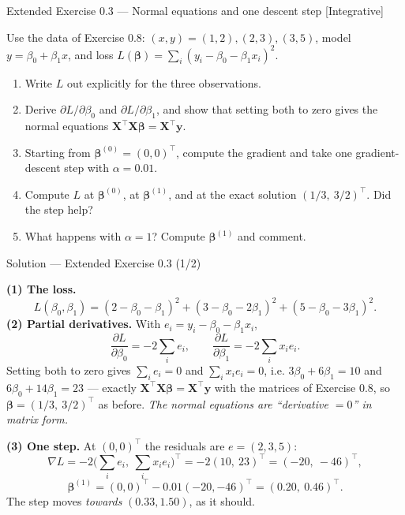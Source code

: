 \documentclass[aspectratio=169,11pt]{beamer}
\begin{document}
\begin{frame}{Extended Exercise 0.3 --- Normal equations and one descent step [Integrative]}
  \begin{longexercise}
    Use the data of Exercise 0.8:
    $(x,y) = (1,2), (2,3), (3,5)$, model $y = \beta_0 + \beta_1 x$, and
    loss $L(\boldsymbol\beta) = \sum_i (y_i - \beta_0 - \beta_1 x_i)^2$.
    \begin{enumerate}
      \item Write $L$ out explicitly for the three observations.
      \item Derive $\partial L/\partial\beta_0$ and
            $\partial L/\partial\beta_1$, and show that setting both to zero
            gives the normal equations
            $\mathbf{X}^\top\mathbf{X}\boldsymbol\beta = \mathbf{X}^\top\mathbf{y}$.
      \item Starting from $\boldsymbol\beta^{(0)} = (0,0)^\top$, compute the
            gradient and take one gradient-descent step with $\alpha = 0.01$.
      \item Compute $L$ at $\boldsymbol\beta^{(0)}$, at
            $\boldsymbol\beta^{(1)}$, and at the exact solution
            $(1/3,\ 3/2)^\top$. Did the step help?
      \item What happens with $\alpha = 1$? Compute
            $\boldsymbol\beta^{(1)}$ and comment.
    \end{enumerate}
  \end{longexercise}
\end{frame}

\begin{frame}{Solution --- Extended Exercise 0.3 (1/2)}
  \begin{solutionbox}
    \scriptsize
    \textbf{(1) The loss.}
    \[
      L(\beta_0,\beta_1) = (2-\beta_0-\beta_1)^2 + (3-\beta_0-2\beta_1)^2
                         + (5-\beta_0-3\beta_1)^2 .
    \]
    \textbf{(2) Partial derivatives.} With $e_i = y_i-\beta_0-\beta_1x_i$,
    \[
      \frac{\partial L}{\partial \beta_0} = -2\sum_i e_i,
      \qquad
      \frac{\partial L}{\partial \beta_1} = -2\sum_i x_i e_i .
    \]
    Setting both to zero gives $\sum_i e_i = 0$ and $\sum_i x_i e_i = 0$, i.e.
    $3\beta_0 + 6\beta_1 = 10$ and $6\beta_0 + 14\beta_1 = 23$ --- exactly
    $\mathbf{X}^\top\mathbf{X}\boldsymbol\beta = \mathbf{X}^\top\mathbf{y}$
    with the matrices of Exercise 0.8, so
    $\boldsymbol\beta = (1/3,\ 3/2)^\top$ as before. \emph{The normal
    equations are ``derivative $=0$'' in matrix form.}

    \textbf{(3) One step.} At $(0,0)^\top$ the residuals are $e = (2,3,5)$:
    \[
      \nabla L = -2\bigl(\textstyle\sum_i e_i,\ \sum_i x_i e_i\bigr)^\top
               = -2(10,\ 23)^\top = (-20,\ -46)^\top ,
    \]
    \[
      \boldsymbol\beta^{(1)} = (0,0)^\top - 0.01(-20,-46)^\top
                             = (0.20,\ 0.46)^\top .
    \]
    The step moves \emph{towards} $(0.33, 1.50)$, as it should.
  \end{solutionbox}
\end{frame}
\end{document}

